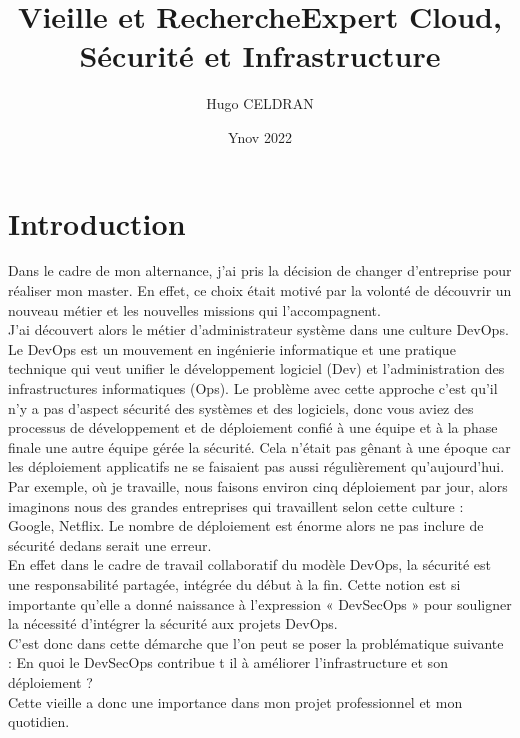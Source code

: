\documentclass[11pt,a4paper,oneside]{book}
\author{Hugo CELDRAN}
\title{Vieille et Recherche}
\title{Expert Cloud, Sécurité et Infrastructure}
\date{Ynov 2022}
\begin{document}
\maketitle
\tableofcontents


\chapter{Introduction}

Dans le cadre de mon alternance, j'ai pris la décision de changer d'entreprise pour réaliser mon master.
En effet, ce choix était motivé par la volonté de découvrir un nouveau métier et les nouvelles missions qui l'accompagnent. \\

J'ai découvert alors le métier d'administrateur système dans une culture DevOps.
Le DevOps est un mouvement en ingénierie informatique et une pratique technique qui veut unifier le développement logiciel (Dev) et l'administration des infrastructures informatiques (Ops).
Le problème avec cette approche c'est qu'il n'y a pas d'aspect sécurité des systèmes et des logiciels, donc vous aviez des processus de développement et de déploiement confié à une équipe et à la phase finale une autre équipe gérée la sécurité.
Cela n'était pas gênant à une époque car les déploiement applicatifs ne se faisaient pas aussi régulièrement qu'aujourd'hui.
Par exemple, où je travaille, nous faisons environ cinq déploiement par jour, alors imaginons nous des grandes entreprises qui travaillent selon cette culture : Google, Netflix. Le nombre de déploiement est énorme alors ne pas inclure de sécurité dedans serait une erreur. \\

En effet dans le cadre de travail collaboratif du modèle DevOps, la sécurité est une responsabilité partagée, intégrée du début à la fin. Cette notion est si importante qu'elle a donné naissance à l'expression « DevSecOps » pour souligner la nécessité d'intégrer la sécurité aux projets DevOps. \\

C'est donc dans cette démarche que l'on peut se poser la problématique suivante : En quoi le DevSecOps contribue t il à améliorer l'infrastructure et son déploiement ? \\

Cette vieille a donc une importance dans mon projet professionnel et mon quotidien. \\
\end{document}

